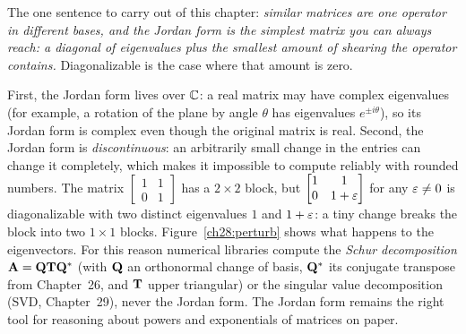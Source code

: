 \begin{focusbox}
The one sentence to carry out of this chapter: \emph{similar matrices are one operator in
different bases, and the Jordan form is the simplest matrix you can always reach: a
diagonal of eigenvalues plus the smallest amount of shearing the operator
contains.} Diagonalizable is the case where that amount is zero.
\end{focusbox}

\begin{remark}
\label{ch28:remark-caution}
First, the Jordan form lives over $\mathbb{C}$: a real matrix may have complex
eigenvalues (for example, a rotation of the plane by angle $\theta$ has eigenvalues $e^{\pm i\theta}$), so its Jordan form is complex
even though the original matrix is real. Second, the Jordan form is \emph{discontinuous}:
an arbitrarily small change in the entries can change it completely, which makes it
impossible to compute reliably with rounded numbers. The matrix $\begin{bmatrix}1&1\\0&1\end{bmatrix}$ has a $2\times2$
block, but $\begin{bmatrix}1&1\\0&1+\varepsilon\end{bmatrix}$ for any $\varepsilon\neq0$ is
diagonalizable with two distinct eigenvalues $1$ and $1+\varepsilon$: a tiny change breaks the
block into two $1\times1$ blocks. Figure~\ref{ch28:perturb} shows what happens to the
eigenvectors.
For this reason numerical libraries compute the \emph{Schur decomposition}
$\mathbf{A} = \mathbf{Q}\mathbf{T}\mathbf{Q}^*$ (with $\mathbf{Q}$ an orthonormal change of basis,
$\mathbf{Q}^*$ its conjugate transpose from Chapter~26, and $\mathbf{T}$ upper triangular) or the
singular value decomposition (SVD, Chapter~29), never the Jordan form. The Jordan form
remains the right tool for reasoning about powers and exponentials of matrices on paper.
\end{remark}


